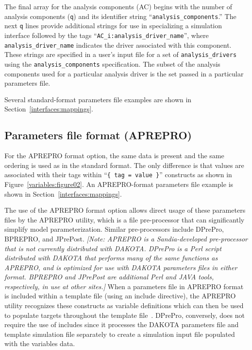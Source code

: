 The final array for the analysis components (AC) begins with the
number of analysis components (\texttt{q}) and its identifier string
``\texttt{analysis\_components}.'' The next \texttt{q} lines provide
additional strings for use in specializing a simulation interface
followed by the tags ``\texttt{AC\_i:analysis\_driver\_name}'', where
\texttt{analysis\_driver\_name} indicates the driver associated with
this component.  These strings are specified in a user's input file
for a set of \texttt{analysis\_drivers} using the
\texttt{analysis\_components} specification.  The subset of the
analysis components used for a particular analysis driver is the set
passed in a particular parameters file.

Several standard-format parameters file examples are shown in
Section~\ref{interfaces:mappings}.

\subsection{Parameters file format (APREPRO)}\label{variables:parameters:aprepro}

For the APREPRO format option, the same data is present and the same
ordering is used as in the standard format. The only difference is
that values are associated with their tags within ``\texttt{\{ tag =
value \}}'' constructs as shown in Figure~\ref{variables:figure02}.
An APREPRO-format parameters file example is shown in
Section~\ref{interfaces:mappings}.

The use of the APREPRO format option allows direct usage of these
parameters files by the APREPRO utility, which is a file pre-processor
that can significantly simplify model parameterization.  Similar
pre-processors include DPrePro, BPREPRO, and JPrePost.  \emph{[Note:
APREPRO is a Sandia-developed pre-processor that is not currently
distributed with DAKOTA.  DPrePro is a Perl script distributed with
DAKOTA that performs many of the same functions as APREPRO, and is
optimized for use with DAKOTA parameters files in either format.
BPREPRO and JPrePost are additional Perl and JAVA tools, respectively,
in use at other sites.]}  When a parameters file in APREPRO format is
included within a template file (using an include directive), the
APREPRO utility recognizes these constructs as variable definitions
which can then be used to populate targets throughout the template
file~\cite{Sja92}.  DPrePro, conversely, does not require the use of
includes since it processes the DAKOTA parameters file and template
simulation file separately to create a simulation input file populated
with the variables data.

